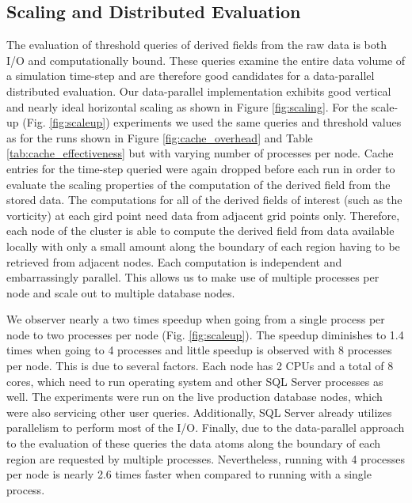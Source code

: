 \documentclass{sig-alternate}
\begin{document}
\subsection{Scaling and Distributed Evaluation}
The evaluation of threshold queries of derived fields from the raw data is both I/O and computationally bound. These queries examine the entire data
volume of a simulation time-step and are therefore good candidates for a data-parallel distributed evaluation. 
Our data-parallel implementation exhibits good vertical and nearly ideal horizontal scaling as shown in Figure \ref{fig:scaling}. 
For the scale-up (Fig. \ref{fig:scaleup}) experiments we used the same
queries and threshold values as for the runs shown in Figure \ref{fig:cache_overhead} and Table \ref{tab:cache_effectiveness} 
but with varying number of processes per node. Cache entries for the
time-step queried were again dropped before each run in order to evaluate the scaling properties of the computation of the derived field from the stored data.
The computations for all of 
the derived fields of interest (such as the vorticity) at each gird point need data from adjacent grid points only. Therefore, each node of the cluster is able to
compute the derived field from data available locally with only a small amount along the boundary of each region having to be retrieved from adjacent nodes.
Each computation is independent and embarrassingly parallel. This allows us to make use of multiple processes per node and scale out to
multiple database nodes.

We observer nearly a two times speedup when going from a single process per node to two processes per node (Fig. \ref{fig:scaleup}). 
The speedup diminishes to 1.4 times when going to 4 processes and little speedup is 
observed with 8 processes per node. This is due to several factors. Each node has 2 CPUs and a total of 8 cores, which need to run operating system and other SQL Server
processes as well. The experiments were run on the live production database nodes, which were also servicing other user queries. Additionally, SQL
Server already utilizes parallelism to perform most of the I/O. Finally, due to the data-parallel approach to the evaluation of these queries the data atoms along
the boundary of each region are requested by multiple processes. Nevertheless, running with 4 processes per node is nearly 2.6 times faster when
compared to running with a single process.
\end{document}
